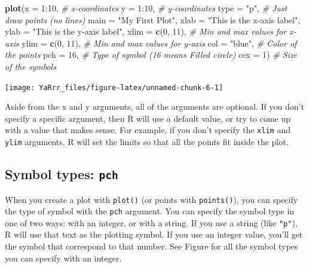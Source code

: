 \documentclass[]{book}
\newenvironment{Shaded}{\begin{snugshade}}{\end{snugshade}}
\newcommand{\KeywordTok}[1]{\textcolor[rgb]{0.13,0.29,0.53}{\textbf{{#1}}}}
\newcommand{\DataTypeTok}[1]{\textcolor[rgb]{0.13,0.29,0.53}{{#1}}}
\newcommand{\DecValTok}[1]{\textcolor[rgb]{0.00,0.00,0.81}{{#1}}}
\newcommand{\StringTok}[1]{\textcolor[rgb]{0.31,0.60,0.02}{{#1}}}
\newcommand{\CommentTok}[1]{\textcolor[rgb]{0.56,0.35,0.01}{\textit{{#1}}}}
\newcommand{\NormalTok}[1]{{#1}}
\theoremstyle{definition}
\theoremstyle{definition}
\theoremstyle{remark}
\begin{document}
\begin{Shaded}
\begin{Highlighting}[]
\KeywordTok{plot}\NormalTok{(}\DataTypeTok{x =} \DecValTok{1}\NormalTok{:}\DecValTok{10}\NormalTok{,                         }\CommentTok{# x-coordinates}
     \DataTypeTok{y =} \DecValTok{1}\NormalTok{:}\DecValTok{10}\NormalTok{,                         }\CommentTok{# y-coordinates}
     \DataTypeTok{type =} \StringTok{"p"}\NormalTok{,                       }\CommentTok{# Just draw points (no lines)}
     \DataTypeTok{main =} \StringTok{"My First Plot"}\NormalTok{,}
     \DataTypeTok{xlab =} \StringTok{"This is the x-axis label"}\NormalTok{,}
     \DataTypeTok{ylab =} \StringTok{"This is the y-axis label"}\NormalTok{,}
     \DataTypeTok{xlim =} \KeywordTok{c}\NormalTok{(}\DecValTok{0}\NormalTok{, }\DecValTok{11}\NormalTok{),                  }\CommentTok{# Min and max values for x-axis}
     \DataTypeTok{ylim =} \KeywordTok{c}\NormalTok{(}\DecValTok{0}\NormalTok{, }\DecValTok{11}\NormalTok{),                  }\CommentTok{# Min and max values for y-axis}
     \DataTypeTok{col =} \StringTok{"blue"}\NormalTok{,                     }\CommentTok{# Color of the points}
     \DataTypeTok{pch =} \DecValTok{16}\NormalTok{,                         }\CommentTok{# Type of symbol (16 means Filled circle)}
     \DataTypeTok{cex =} \DecValTok{1}\NormalTok{)                           }\CommentTok{# Size of the symbols}
\end{Highlighting}
\end{Shaded}

\begin{center}\texttt{[image: YaRrr\_files/figure-latex/unnamed-chunk-6-1]} \end{center}

Aside from the x and y arguments, all of the arguments are optional. If
you don't specify a specific argument, then R will use a default value,
or try to come up with a value that makes sense. For example, if you
don't specify the \texttt{xlim} and \texttt{ylim} arguments, R will set
the limits so that all the points fit inside the plot.

\subsection{\texorpdfstring{Symbol types:
\texttt{pch}}{Symbol types: pch}}\label{symbol-types-pch}

When you create a plot with \texttt{plot()} (or points with
\texttt{points()}), you can specify the type of symbol with the
\texttt{pch} argument. You can specify the symbol type in one of two
ways: with an integer, or with a string. If you use a string (like
\texttt{"p"}), R will use that text as the plotting symbol. If you use
an integer value, you'll get the symbol that correspond to that number.
See Figure for all the symbol types you can specify with an integer.
\end{document}
